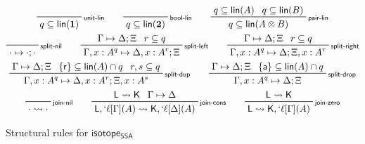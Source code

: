 \documentclass[acmsmall,screen,review]{acmart}
\newcommand{\ms}[1]{\ensuremath{\mathsf{#1}}}
\newcommand{\lbl}[1]{{`#1}}
\newcommand{\csplits}[3]{#1 \mapsto #2;#3}
\newcommand{\cwk}[2]{#1 \mapsto #2}
\newcommand{\lwk}[2]{#1 \rightsquigarrow #2}
\newcommand{\tlin}[2]{#2 \subseteq \ms{lin}(#1)}
\newcommand{\ltlin}[3]{#3 \subseteq \ms{lin}(#1) \cap #2}
\newcommand{\thyp}[3]{#1: {#2}^{#3}}
\newcommand{\lhyp}[3]{#1[#2](#3)}
\newcommand{\llhyp}[3]{\lhyp{\lbl{#1}}{#2}{#3}}
\newcommand{\rle}[1]{{\scriptsize\textsf{#1}}}
\newcommand{\taff}{{\{\ms{a}\}}}
\newcommand{\trel}{{\{\ms{r}\}}}
\newcommand{\isotopessa}{\ms{isotope_{SSA}}}
\begin{document}
\begin{figure}
  \begin{gather*}    
    \prftree[r]{\rle{unit-lin}}{}{\tlin{\mathbf{1}}{q}} 
    \qquad
    \prftree[r]{\rle{bool-lin}}{}{\tlin{\mathbf{2}}{q}} 
    \qquad
    \prftree[r]{\rle{pair-lin}}{\tlin{A}{q}}{\tlin{B}{q}}{\tlin{A \otimes B}{q}} 
    \\
    \prftree[r]{\rle{split-nil}}{\csplits{\cdot}{\cdot}{\cdot}} \qquad
    \prftree[r]{\rle{split-left}}
      {\csplits{\Gamma}{\Delta}{\Xi}}
      {r \subseteq q}
      {\csplits{\Gamma, \thyp{x}{A}{q}}{\Delta, \thyp{x}{A}{r}}{\Xi}} \qquad
    \prftree[r]{\rle{split-right}}
      {\csplits{\Gamma}{\Delta}{\Xi}}
      {r \subseteq q}
      {\csplits{\Gamma, \thyp{x}{A}{q}}{\Delta}{\Xi, \thyp{x}{A}{r}}} \\
    \prftree[r]{\rle{split-dup}}
      {\csplits{\Gamma}{\Delta}{\Xi}}
      {\ltlin{A}{q}{\trel}}
      {r, s \subseteq q}
      {\csplits{\Gamma, \thyp{x}{A}{q}}{\Delta, \thyp{x}{A}{r}}{\Xi, \thyp{x}{A}{s}}}
      \qquad
    \prftree[r]{\rle{split-drop}}
      {\csplits{\Gamma}{\Delta}{\Xi}}
      {\ltlin{A}{q}{\taff}}
      {\csplits{\Gamma, \thyp{x}{A}{q}}{\Delta}{\Xi}}
      \\
    \prftree[r]{\rle{join-nil}}{\lwk{\cdot}{\cdot}} \qquad
    \prftree[r]{\rle{join-cons}}
      {\lwk{\ms{L}}{\ms{K}}}
      {\cwk{\Gamma}{\Delta}}
      {\lwk{\ms{L}, \llhyp{\ell}{\Gamma}{A}}{\ms{K}, \llhyp{\ell}{\Delta}{A}}} 
      \qquad
    \prftree[r]{\rle{join-zero}}
      {\lwk{\ms{L}}{\ms{K}}}
      {\lwk{\ms{L}}{\ms{K}, \llhyp{\ell}{\Gamma}{A}}} 
  \end{gather*}
  \caption{Structural rules for \isotopessa}
  \label{fig:ssa-structural}
\end{figure}
\end{document}

